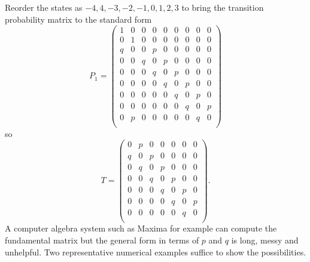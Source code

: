 \documentclass[12pt]{article}
\begin{document}
\begin{example}
    Reorder the states as \( -4, 4, -3, -2, -1, 0, 1, 2, 3 \) to bring
    the transition probability matrix to the standard form
    \[
        P_{1} =
        \begin{pmatrix}
            1 & 0 & 0 & 0 & 0 & 0 & 0 & 0 & 0 \\
            0 & 1 & 0 & 0 & 0 & 0 & 0 & 0 & 0 \\
            q & 0 & 0 & p & 0 & 0 & 0 & 0 & 0 \\
            0 & 0 & q & 0 & p & 0 & 0 & 0 & 0 \\
            0 & 0 & 0 & q & 0 & p & 0 & 0 & 0 \\
            0 & 0 & 0 & 0 & q & 0 & p & 0 & 0 \\
            0 & 0 & 0 & 0 & 0 & q & 0 & p & 0 \\
            0 & 0 & 0 & 0 & 0 & 0 & q & 0 & p \\
            0 & p & 0 & 0 & 0 & 0 & 0 & q & 0 \\
        \end{pmatrix}
    \] so
    \[
        T =
        \begin{pmatrix}
            0 & p & 0 & 0 & 0 & 0 & 0  \\
            q & 0 & p & 0 & 0 & 0 & 0  \\
            0 & q & 0 & p & 0 & 0 & 0  \\
            0 & 0 & q & 0 & p & 0 & 0  \\
            0 & 0 & 0 & q & 0 & p & 0  \\
            0 & 0 & 0 & 0 & q & 0 & p  \\
            0 & 0 & 0 & 0 & 0 & q & 0  \\
        \end{pmatrix}.
    \] A computer algebra system such as Maxima for example can compute
    the fundamental matrix but the general form in terms of \( p \)
    and \( q \) is long, messy and unhelpful.
    Two representative numerical examples suffice to show
    the possibilities.


\end{example}
\end{document}
